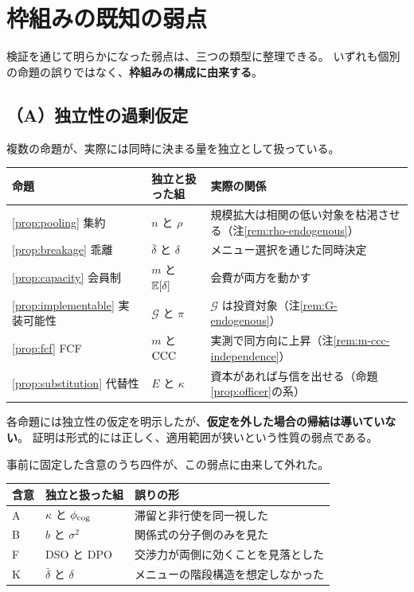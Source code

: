\section{枠組みの既知の弱点}

検証を通じて明らかになった弱点は、三つの類型に整理できる。
いずれも個別の命題の誤りではなく、\textbf{枠組みの構成に由来する}。

\subsection{（A）独立性の過剰仮定}
\label{sec:independence-assumption}

複数の命題が、実際には同時に決まる量を独立として扱っている。

\begin{center}
\begin{tabularx}{\textwidth}{@{}lXX@{}}
\toprule
命題 & 独立と扱った組 & 実際の関係 \\
\midrule
\ref{prop:pooling} 集約 & $n$ と $\rho$ & 規模拡大は相関の低い対象を枯渇させる（注\ref{rem:rho-endogenous}） \\
\ref{prop:breakage} 乖離 & $\bar\delta$ と $\delta$ & メニュー選択を通じた同時決定 \\
\ref{prop:capacity} 会員制 & $m$ と $\mathbb{E}[\delta]$ & 会費が両方を動かす \\
\ref{prop:implementable} 実装可能性 & $\mathcal{G}$ と $\pi$ & $\mathcal{G}$ は投資対象（注\ref{rem:G-endogenous}） \\
\ref{prop:fcf} FCF & $m$ と $\mathrm{CCC}$ & 実測で同方向に上昇（注\ref{rem:m-ccc-independence}） \\
\ref{prop:substitution} 代替性 & $E$ と $\kappa$ & 資本があれば与信を出せる（命題\ref{prop:officer}の系） \\
\bottomrule
\end{tabularx}
\label{tab:independence-assumptions}
\end{center}

各命題には独立性の仮定を明示したが、\textbf{仮定を外した場合の帰結は導いていない}。
証明は形式的には正しく、適用範囲が狭いという性質の弱点である。

事前に固定した含意のうち四件が、この弱点に由来して外れた。

\begin{center}
\begin{tabularx}{\textwidth}{@{}lXX@{}}
\toprule
含意 & 独立と扱った組 & 誤りの形 \\
\midrule
A & $\kappa$ と $\phi_{\rm cog}$ & 滞留と非行使を同一視した \\
B & $b$ と $\sigma^2$ & 関係式の分子側のみを見た \\
F & DSO と DPO & 交渉力が両側に効くことを見落とした \\
K & $\bar\delta$ と $\delta$ & メニューの階段構造を想定しなかった \\
\bottomrule
\end{tabularx}
\label{tab:independence-failed-predictions}
\end{center}

